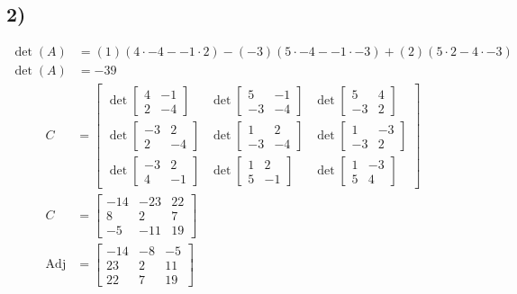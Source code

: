 \documentclass{article}
\begin{document}
\subsection{2)}
\begin{align*}
	\det(A) & = (1)(4 \cdot -4 - -1 \cdot 2) - (-3)(5 \cdot -4 - -1 \cdot -3) + (2)(5 \cdot 2 - 4 \cdot -3) \\
	\det(A) & = -39
\end{align*}
\begin{align*}
	C & = \begin{bmatrix}
		\det \begin{bmatrix} 4 & -1 \\ 2 & -4 \end{bmatrix} & \det \begin{bmatrix} 5 & -1 \\ -3 & -4 \end{bmatrix} & \det \begin{bmatrix} 5 & 4 \\ -3 & 2 \end{bmatrix} \\
		\det \begin{bmatrix} -3 & 2 \\ 2 & -4 \end{bmatrix} & \det \begin{bmatrix} 1 & 2 \\ -3 & -4 \end{bmatrix} & \det \begin{bmatrix} 1 & -3 \\ -3 & 2 \end{bmatrix} \\
		\det \begin{bmatrix} -3 & 2 \\ 4 & -1 \end{bmatrix} & \det \begin{bmatrix} 1 & 2 \\ 5 & -1 \end{bmatrix} & \det \begin{bmatrix} 1 & -3 \\ 5 & 4 \end{bmatrix}
	\end{bmatrix} \\
	C & = \begin{bmatrix}
		-14 & -23 & 22 \\
		8 & 2 & 7 \\
		-5 & -11 & 19
	\end{bmatrix} \\
	\text{Adj} & = \begin{bmatrix}
		-14 & -8 & -5 \\
		23 & 2 & 11 \\
		22 & 7 & 19
	\end{bmatrix}
\end{align*}
\end{document}
